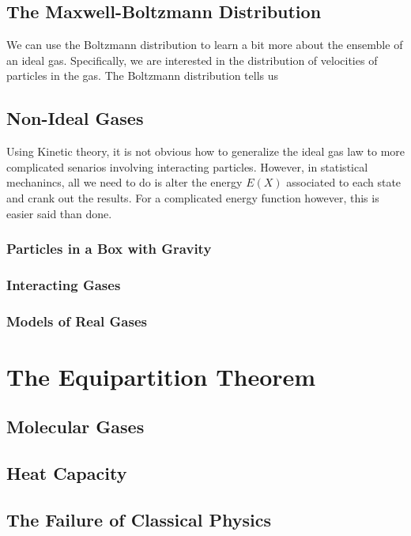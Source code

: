 \documentclass[11pt,a4paper]{article}
\theoremstyle{theorem}
\theoremstyle{definition}
\theoremstyle{definition}
\theoremstyle{remark}
\theoremstyle{definition}
\theoremstyle{remark}
\begin{document}
\subsection{The Maxwell-Boltzmann Distribution}

We can use the Boltzmann distribution to learn a bit more about the ensemble of an ideal gas. Specifically, we are interested in the distribution of velocities of particles in the gas. The Boltzmann distribution tells us  

\subsection{Non-Ideal Gases}

Using  Kinetic theory, it is not obvious how to generalize the ideal gas law to more complicated senarios involving interacting particles. However, in statistical mechanincs, all we need to do is alter the energy $E(X)$ associated to each state and crank out the results. For a complicated energy function however, this is easier said than done. 

\subsubsection{Particles in a Box with Gravity}

\subsubsection{Interacting Gases}

\subsubsection{Models of Real Gases}

\section{The Equipartition Theorem}

\subsection{Molecular Gases}

\subsection{Heat Capacity}

\subsection{The Failure of Classical Physics}
\end{document}
